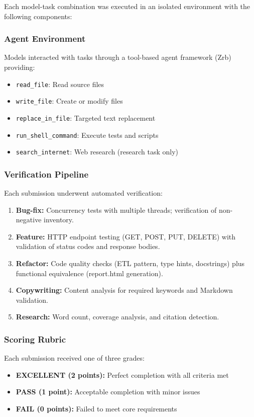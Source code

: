 Each model-task combination was executed in an isolated environment with the following components:

\subsubsection{Agent Environment}
Models interacted with tasks through a tool-based agent framework (Zrb) providing:
\begin{itemize}
    \item \texttt{read\_file}: Read source files
    \item \texttt{write\_file}: Create or modify files
    \item \texttt{replace\_in\_file}: Targeted text replacement
    \item \texttt{run\_shell\_command}: Execute tests and scripts
    \item \texttt{search\_internet}: Web research (research task only)
\end{itemize}

\subsubsection{Verification Pipeline}
Each submission underwent automated verification:

\begin{enumerate}
    \item \textbf{Bug-fix:} Concurrency tests with multiple threads; verification of non-negative inventory.
    \item \textbf{Feature:} HTTP endpoint testing (GET, POST, PUT, DELETE) with validation of status codes and response bodies.
    \item \textbf{Refactor:} Code quality checks (ETL pattern, type hints, docstrings) plus functional equivalence (report.html generation).
    \item \textbf{Copywriting:} Content analysis for required keywords and Markdown validation.
    \item \textbf{Research:} Word count, coverage analysis, and citation detection.
\end{enumerate}

\subsubsection{Scoring Rubric}
Each submission received one of three grades:

\begin{itemize}
    \item \textbf{EXCELLENT (2 points):} Perfect completion with all criteria met
    \item \textbf{PASS (1 point):} Acceptable completion with minor issues
    \item \textbf{FAIL (0 points):} Failed to meet core requirements
\end{itemize}


